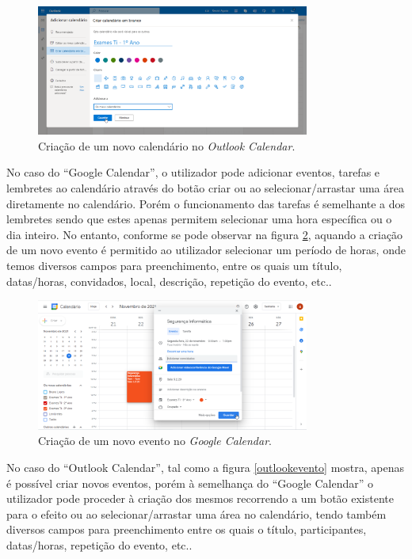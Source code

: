 \documentclass[11pt, twoside]{report}
\begin{document}
	\begin{figure}[H] 
		\centering
		\includegraphics[width=0.8\textwidth,height=0.8\textheight,keepaspectratio]{image/estadodearte/criacao_calendario_outlook}
		\caption{Criação de um novo calendário no \textit{Outlook Calendar}.}
		\label{calendariooutlook}
	\end{figure}

	No caso do ``Google Calendar'', o utilizador pode adicionar eventos, tarefas e lembretes ao calendário através do botão criar ou ao selecionar/arrastar uma área diretamente no calendário.
	Porém o funcionamento das tarefas é semelhante a dos lembretes sendo que estes apenas permitem selecionar uma hora específica ou o dia inteiro. No entanto, conforme se pode observar na figura \ref{googlenovoevento}, aquando a criação de um novo evento é permitido ao utilizador selecionar um período de horas, onde temos diversos campos para preenchimento, entre os quais um título, datas/horas, convidados, local, descrição, repetição do evento, etc..

	\begin{figure}[H] 
		\centering
		\includegraphics[width=0.8\textwidth,height=0.8\textheight,keepaspectratio]{image/estadodearte/criacao_evento_google}
		\caption{Criação de um novo evento no \textit{Google Calendar}.}
		\label{googlenovoevento}
	\end{figure}

	No caso do ``Outlook Calendar'', tal como a figura \ref{outlookevento} mostra, apenas é possível criar novos eventos, porém à semelhança do ``Google Calendar'' o utilizador pode proceder à criação dos mesmos recorrendo a um botão existente para o efeito ou ao selecionar/arrastar uma área no calendário, tendo também diversos campos para preenchimento entre os quais o título, participantes, datas/horas, repetição do evento, etc..
\end{document}
